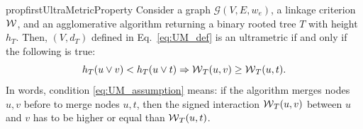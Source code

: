 \begin{restatable}{prop}{firstUltraMetricProperty}
\label{prop:ultraMetric1}
Consider a graph $\mathcal{G}(V,E,w_e)$, a linkage criterion $\mathcal{W}{}$, and an agglomerative algorithm returning a binary rooted tree $T$ with height $h_T$. Then, $(V, d_{T})$ defined in Eq.~\ref{eq:UM_def} is an ultrametric if and only if the following is true:
\begin{equation}\label{eq:UM_assumption}
 h_T(u \vee v) < h_T(u \vee t) \Rightarrow \mathcal{W}{}_{T}(u,v) \geq \mathcal{W}{}_{T}(u,t).
\end{equation}
In words, condition \ref{eq:UM_assumption} means: if the algorithm merges nodes $u,v$ before to merge nodes $u,t$, then the signed interaction $\mathcal{W}{}_{T}(u,v)$ between $u$ and $v$ has to be higher or equal than $\mathcal{W}{}_{T}(u,t)$.
\end{restatable}
